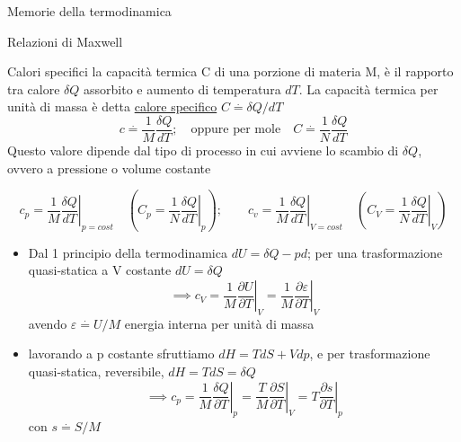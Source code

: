 \documentclass[a4paper,11pt]{report}
\newcommand{\defeq}{\overset{\cdot}{=}}
\begin{document}
\begin{chapter}{Memorie della termodinamica}
\begin{section}{Relazioni di Maxwell}
\begin{itemize}
		\end{itemize}
	\end{section}
	\begin{section}{Calori specifici}
		la capacità termica C di una porzione di materia M, è il rapporto tra calore $\delta Q$ assorbito e aumento di temperatura $dT$. La capacità termica per unità di massa è detta \underline{calore specifico} $C \defeq \delta Q/ dT$
		$$
		c \defeq \dfrac{1}{M}\dfrac{\delta Q}{d T}; \quad \textrm{oppure per mole} \quad C \defeq \dfrac{1}{N}\dfrac{\delta Q}{d T}
		$$
		Questo valore dipende dal tipo di processo in cui avviene lo scambio di $\delta Q$, ovvero a pressione o volume costante
		
		$$
		c_p = \left.\dfrac{1}{M}\dfrac{\delta Q}{d T}\right|_{p=cost} \quad \left( C_p = \left.\dfrac{1}{N}\dfrac{\delta Q}{d T}\right|_{p} \right); \qquad c_v=  \left.\dfrac{1}{M}\dfrac{\delta Q}{d T}\right|_{V=cost} \quad  \left( C_V = \left.\dfrac{1}{N}\dfrac{\delta Q}{d T}\right|_{V} \right)
		$$
		
		\begin{itemize}
			\item Dal 1 principio della termodinamica $dU = \delta Q - pd$; per una trasformazione quasi-statica a V costante $dU = \delta Q$
			$$
			\implies c_V =  \left.\dfrac{1}{M}\dfrac{\partial U}{\partial T}\right|_{V} =  \left.\dfrac{1}{M}\dfrac{\partial \varepsilon}{\partial T}\right|_{V}
			$$
			avendo $\varepsilon \defeq U/M$ energia interna per unità di massa
			
			\item lavorando a p costante sfruttiamo $dH = TdS  + Vdp$, e per trasformazione quasi-statica, reversibile, $dH = TdS = \delta Q$
			$$
			\implies c_p =  \left.\dfrac{1}{M}\dfrac{\delta Q }{\partial T}\right|_{p} =
			\left.\dfrac{T}{M}\dfrac{\partial S}{\partial T}\right|_{V} = 
			\left. T \dfrac{\partial s}{\partial T}\right|_{p}
			$$
			con $s\defeq S/M$
			

\end{itemize}
\end{section}
\end{chapter}
\end{document}
